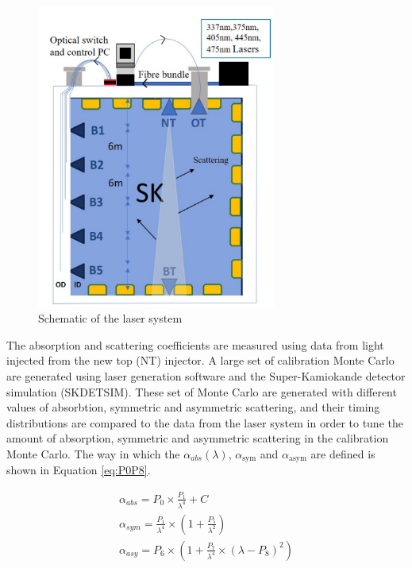\begin{figure}
    \centering
    \includegraphics[width=0.7\textwidth]{Figures/laser_system.png}
    \caption{Schematic of the laser system}
    \label{fig:laser_system}
\end{figure}

The absorption and scattering coefficients are measured using data from light injected from the new top (NT) injector. A large set of calibration Monte Carlo are generated using laser generation software and the Super-Kamiokande detector simulation (SKDETSIM). These set of Monte Carlo are generated with different values of absorbtion, symmetric and asymmetric scattering, and their timing distributions are compared to the data from the laser system in order to tune the amount of absorption, symmetric and asymmetric scattering in the calibration Monte Carlo. The way in which the $\alpha_{abs}(\lambda)$, $\alpha_{\text {sym}}$ and $\alpha_{\text {asym}}$ are defined is shown in Equation \ref{eq:P0P8}.

\begin{equation}
\begin{gathered}
\alpha_{a b s}=P_{0} \times \frac{P_{1}}{\lambda^{4}}+C \label{eq:P0P8}\\ 
\alpha_{s y m}=\frac{P_{1}}{\lambda^{4}} \times\left(1+\frac{P_{5}}{\lambda^{2}}\right) \\
\alpha_{a s y}=P_{6} \times\left(1+\frac{P_{7}}{\lambda^{4}} \times\left(\lambda-P_{8}\right)^{2}\right)
\end{gathered}
\end{equation}


